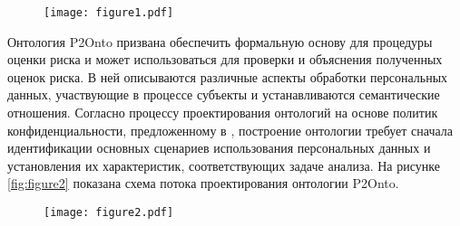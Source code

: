 \documentclass[../main]{subfiles}
\begin{document}
\begin{figure}[H]
    \centering
    {\texttt{[image: figure1.pdf]}}
    \vspace{-\baselineskip}
\end{figure}

Онтология P2Onto призвана обеспечить формальную основу для процедуры оценки риска и может использоваться для проверки и объяснения полученных оценок риска. В ней описываются различные аспекты обработки персональных данных, участвующие в процессе субъекты и устанавливаются семантические отношения. Согласно процессу проектирования онтологий на основе политик конфиденциальности, предложенному в \cite{MDPI8}, построение онтологии требует сначала идентификации основных сценариев использования персональных данных и установления их характеристик, соответствующих задаче анализа. На рисунке \ref{fig:figure2} показана схема потока проектирования онтологии P2Onto. 

\begin{figure}[H]
    \centering
    {\texttt{[image: figure2.pdf]}}
    \vspace{-\baselineskip}
\end{figure}
\end{document}
